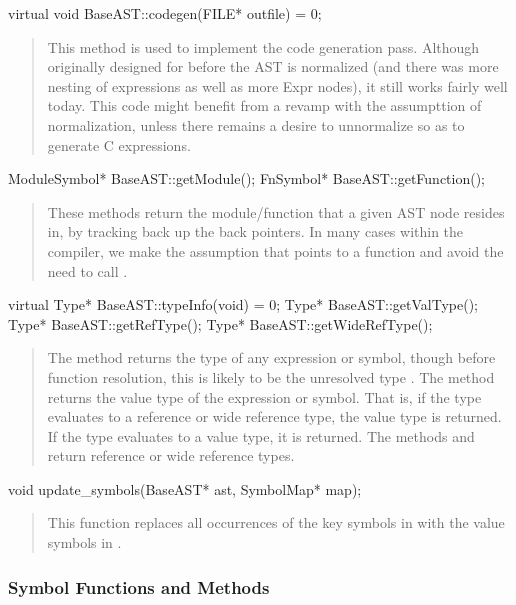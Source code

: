 \documentclass[10pt]{article}
\begin{document}
\begin{clang}
virtual void BaseAST::codegen(FILE* outfile) = 0;
\end{clang}
\begin{quote}
This method is used to implement the code generation pass.  Although
originally designed for before the AST is normalized (and there was
more nesting of expressions as well as more Expr nodes), it still
works fairly well today.  This code might benefit from a revamp with
the assumpttion of normalization, unless there remains a desire to
unnormalize so as to generate C expressions.
\end{quote}

\begin{clang}
ModuleSymbol* BaseAST::getModule();
FnSymbol* BaseAST::getFunction();
\end{clang}
\begin{quote}
These methods return the module/function that a given AST node resides
in, by tracking back up the back pointers.  In many cases within the
compiler, we make the assumption that  points to a
function and avoid the need to call .
\end{quote}

\begin{clang}
virtual Type* BaseAST::typeInfo(void) = 0;
Type* BaseAST::getValType();
Type* BaseAST::getRefType();
Type* BaseAST::getWideRefType();
\end{clang}
\begin{quote}
The method  returns the type of any expression or symbol,
  though before function resolution, this is likely to be the
  unresolved type .  The method  returns
  the value type of the expression or symbol.  That is, if the type
  evaluates to a reference or wide reference type, the value type is
  returned.  If the type evaluates to a value type, it is returned.
  The methods  and  return reference
  or wide reference types.
\end{quote}

\begin{clang}
void update_symbols(BaseAST* ast, SymbolMap* map);
\end{clang}
\begin{quote}
This function replaces all occurrences of the key symbols in 
with the value symbols in .
\end{quote}

\subsubsection{Symbol Functions and Methods}
\end{document}
